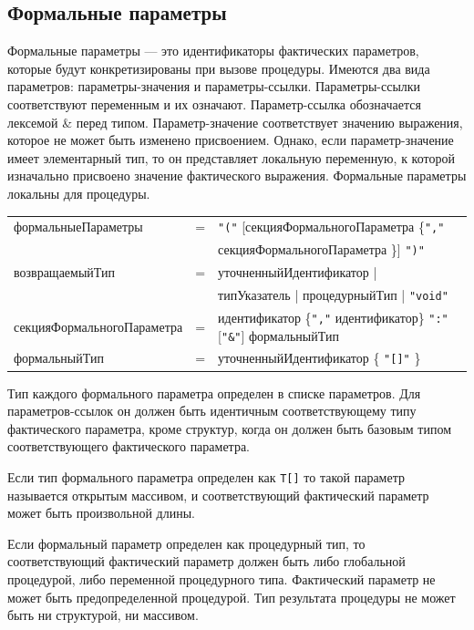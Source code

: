 \documentclass[a4paper,12pt]{article}
\newcommand{\lit}[1]{\texttt{"#1"}}
\begin{document}
    \subsection*{Формальные параметры}

    Формальные параметры — это идентификаторы фактических параметров, которые будут конкретизированы при вызове процедуры. Имеются два вида параметров: параметры-значения и параметры-ссылки. Параметры-ссылки соответствуют переменным и их означают. Параметр-ссылка обозначается лексемой \& перед типом. Параметр-значение соответствует значению выражения, которое не может быть изменено присвоением. Однако, если параметр-значение имеет элементарный тип, то он представляет локальную переменную, к которой изначально присвоено значение фактического выражения. Формальные параметры локальны для процедуры.

    \begin{center}
        \begin{tabular}{l c l}
            формальныеПараметры & = & \lit{(} [секцияФормальногоПараметра \{\lit{,} \\
            & & секцияФормальногоПараметра \}] \lit{)} \\
            возвращаемыйТип & = & уточненныйИдентификатор | \\
            & & типУказатель | процедурныйТип | \lit{void} \\
            секцияФормальногоПараметра & = & идентификатор \{\lit{,} идентификатор\} \lit{:} [\lit{\&}] формальныйТип \\
            формальныйТип & = & уточненныйИдентификатор \{ \lit{[]} \}
        \end{tabular}
    \end{center}

    Тип каждого формального параметра определен в списке параметров. Для параметров-ссылок он должен быть идентичным соответствующему типу фактического параметра, кроме структур, когда он должен быть базовым типом соответствующего фактического параметра.

    Если тип формального параметра определен как \texttt{T[]} то такой параметр называется открытым массивом, и соответствующий фактический параметр может быть произвольной длины.

    Если формальный параметр определен как процедурный тип, то соответствующий фактический параметр должен быть либо глобальной процедурой, либо переменной процедурного типа. Фактический параметр не может быть предопределенной процедурой. Тип результата процедуры не может быть ни структурой, ни массивом.
\end{document}
